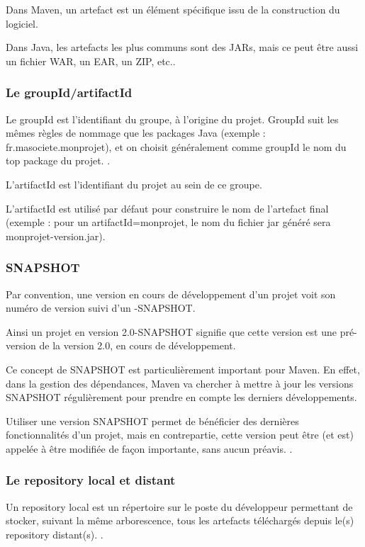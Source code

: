  Dans Maven, un artefact est un élément spécifique issu de la construction du logiciel. 
 
 Dans Java, les artefacts les plus communs sont des JARs, mais ce peut être aussi un fichier WAR, un EAR, un ZIP, etc.\parencite{maven}.

  
 
     \subsubsection{Le groupId/artifactId }
   Le groupId est l'identifiant du groupe, à l'origine du projet. GroupId suit les mêmes règles de nommage que les packages  Java (exemple : fr.masociete.monprojet), et on choisit généralement comme groupId le nom du top package du projet. \parencite{maven}.
   
   L'artifactId est l'identifiant du projet au sein de ce groupe. 
   
   L'artifactId est utilisé par défaut pour construire le nom de l'artefact final (exemple : pour un artifactId=monprojet, le nom du fichier jar généré sera monprojet-version.jar).  \subsubsection{  SNAPSHOT  }
 
    Par convention, une version en cours de développement d'un projet voit son numéro de version suivi d'un -SNAPSHOT. 
    
    Ainsi un projet en version 2.0-SNAPSHOT signifie que cette version est une pré-version de la version 2.0, en cours de développement. 
    
    Ce concept de SNAPSHOT est particulièrement important pour Maven. En effet, dans la gestion des dépendances, Maven va chercher à mettre à jour les versions SNAPSHOT régulièrement pour prendre en compte les derniers développements. 
    
    Utiliser une version SNAPSHOT permet de bénéficier des dernières fonctionnalités d'un projet, mais en contrepartie, cette version peut être (et est) appelée à être modifiée de façon importante, sans aucun préavis. \parencite{maven}.
       \subsubsection{Le repository local et distant }
    Un repository local est un répertoire sur le poste du développeur permettant de stocker, suivant la même arborescence, tous les artefacts téléchargés depuis le(s) repository distant(s). \cite{maven}.
    
